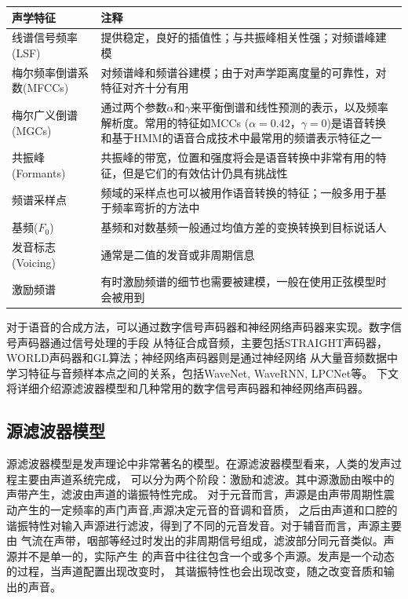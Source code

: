 \begin{table}[!hpt]
    \label{tab:vc_feats}
    \centering
    \begin{tabular}{p{}p{}} 
        \toprule
        声学特征 & 注释　\\
        \midrule
        线谱信号频率(LSF) & 提供稳定，良好的插值性；与共振峰相关性强；对频谱峰建模　\\
        梅尔频率倒谱系数(MFCCs) & 对频谱峰和频谱谷建模；由于对声学距离度量的可靠性，对特征对齐十分有用 \\
        梅尔广义倒谱(MGCs) & 通过两个参数$\alpha$和$\gamma$来平衡倒谱和线性预测的表示，以及频率解析度。常用的特征如MCCs ($\alpha=0.42$，$\gamma=0$)是语音转换和基于HMM的语音合成技术中最常用的频谱表示特征之一　\\
        共振峰(Formants) & 共振峰的带宽，位置和强度将会是语音转换中非常有用的特征，但是它们的有效估计仍具有挑战性　\\
        频谱采样点 & 频域的采样点也可以被用作语音转换的特征；一般多用于基于频率弯折的方法中\\
        \midrule
        基频($F_0$) & 基频和对数基频一般通过均值方差的变换转换到目标说话人 \\
        \midrule
        发音标志(Voicing) & 通常是二值的发音或非周期信息 \\
        \midrule
        激励频谱 & 有时激励频谱的细节也需要被建模，一般在使用正弦模型时会被用到\\
        \bottomrule
    \end{tabular}
\end{table}

对于语音的合成方法，可以通过数字信号声码器和神经网络声码器来实现。数字信号声码器通过信号处理的手段
从特征合成音频，主要包括STRAIGHT声码器，WORLD声码器和GL算法；神经网络声码器则是通过神经网络
从大量音频数据中学习特征与音频样本点之间的关系，包括WaveNet, WaveRNN, LPCNet等。
下文将详细介绍源滤波器模型和几种常用的数字信号声码器和神经网络声码器。

\subsection{源滤波器模型}
源滤波器模型是发声理论中非常著名的模型。在源滤波器模型看来，人类的发声过程主要由声道系统完成，
可以分为两个阶段：激励和滤波。其中源激励由喉中的声带产生，滤波由声道的谐振特性完成。
对于元音而言，声源是由声带周期性震动产生的一定频率的声门声音,声源决定元音的音调和音质，
之后由声道和口腔的谐振特性对输入声源进行滤波，得到了不同的元音发音。对于辅音而言，声源主要由
气流在声带，咽部等经过时发出的非周期信号组成，滤波部分同元音类似。声源并不是单一的，实际产生
的声音中往往包含一个或多个声源。发声是一个动态的过程，当声道配置出现改变时，
其谐振特性也会出现改变，随之改变音质和输出的声音。

